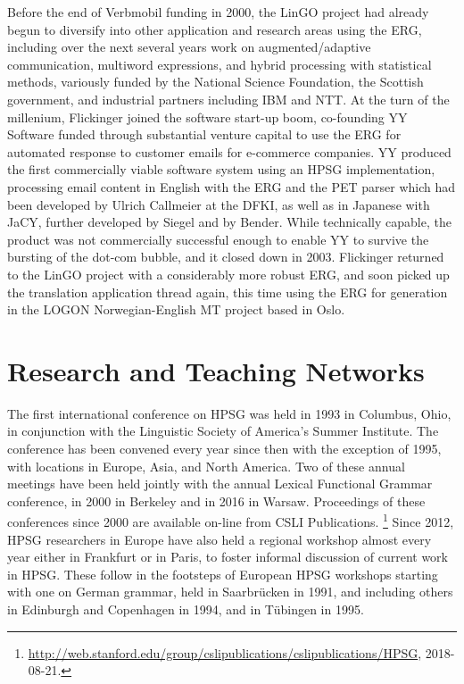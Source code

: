 \documentclass[output=paper]{langsci/langscibook}
\begin{document}
Before the end of Verbmobil funding in 2000, the LinGO project had already begun to diversify into other application and research areas using the ERG, including over the next several years work on augmented/adaptive communication, multiword expressions, and hybrid processing with statistical methods, variously funded by the National Science Foundation, the Scottish government, and industrial partners including IBM and NTT.  At the turn of the millenium, Flickinger joined the software start-up boom, co-founding YY Software funded through substantial venture capital to use the ERG for automated response to customer emails for e-commerce companies.  YY produced the first commercially viable software system using an HPSG implementation, processing email content in English with the ERG and the PET parser \citep{callmeier00} which had been developed by Ulrich Callmeier at the DFKI, as well as in Japanese with JaCY, further developed by Siegel and by Bender.  While technically capable, the product was not commercially successful enough to enable YY to survive the bursting of the dot-com bubble, and it closed down in 2003.  Flickinger returned to the LinGO project with a considerably more robust ERG, and soon picked up the translation application thread again, this time using the ERG for generation in the LOGON Norwegian-English MT project based in Oslo.


\section{Research and Teaching Networks}

The first international conference on HPSG was held in 1993 in Columbus, Ohio, in conjunction with
the Linguistic Society of America's Summer Institute.  The conference has been convened every year
since then with the exception of 1995, with locations in Europe, Asia, and North America.  Two of
these annual meetings have been held jointly with the annual Lexical Functional Grammar conference,
in 2000 in Berkeley and in 2016 in Warsaw.  Proceedings of these conferences since 2000 are
available on-line from CSLI
Publications. \footnote{\url{http://web.stanford.edu/group/cslipublications/cslipublications/HPSG}, 2018-08-21.}  Since 2012, HPSG researchers in Europe have also held a regional workshop almost every year either in Frankfurt or in Paris, to foster informal discussion of current work in HPSG.  These follow in the footsteps of European HPSG workshops starting with one on German grammar, held in Saarbr{\"u}cken in 1991, and including others in Edinburgh and Copenhagen in 1994, and in T{\"u}bingen in 1995.
\end{document}
